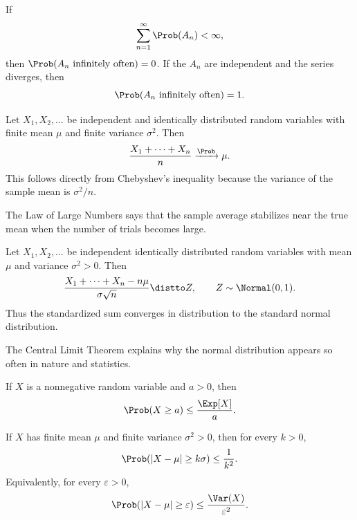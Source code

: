     \begin{theorem}
        If
        \[
            \sum_{n=1}^{\infty}\Prob(A_n)<\infty,
        \]
        then $\Prob(A_n\text{ infinitely often})=0$. If the $A_n$ are
        independent and the series diverges, then
        \[
            \Prob(A_n\text{ infinitely often})=1.
        \]
    \end{theorem}

    \begin{theorem}
        Let $X_1,X_2,\dots$ be independent and identically distributed random
        variables with finite mean $\mu$ and finite variance $\sigma^2$. Then
        \[
            \frac{X_1+\cdots+X_n}{n}
            \xrightarrow{\Prob}
            \mu.
        \]
        This follows directly from Chebyshev's inequality because the variance
        of the sample mean is $\sigma^2/n$.
    \end{theorem}

    \begin{idea}
        The Law of Large Numbers says that the sample average stabilizes near
        the true mean when the number of trials becomes large.
    \end{idea}

    \begin{theorem}
        Let $X_1,X_2,\dots$ be independent identically distributed random
        variables with mean $\mu$ and variance $\sigma^2>0$. Then
        \[
            \frac{X_1+\cdots+X_n-n\mu}{\sigma\sqrt n}
            \distto
            Z,
            \qquad
            Z\sim\Normal(0,1).
        \]
        Thus the standardized sum converges in distribution to the standard
        normal distribution.
    \end{theorem}

    \begin{remark}
        The Central Limit Theorem explains why the normal distribution appears
        so often in nature and statistics.
    \end{remark}

    \begin{theorem}
        If $X$ is a nonnegative random variable and $a>0$, then
        \[
            \Prob(X\geq a)
            \leq
            \frac{\Exp[X]}{a}.
        \]
    \end{theorem}

    \begin{theorem}
        If $X$ has finite mean $\mu$ and finite variance $\sigma^2>0$, then
        for every $k>0$,
        \[
            \Prob(|X-\mu|\geq k\sigma)
            \leq
            \frac{1}{k^2}.
        \]
        Equivalently, for every $\varepsilon>0$,
        \[
            \Prob(|X-\mu|\geq \varepsilon)
            \leq
            \frac{\Var(X)}{\varepsilon^2}.
        \]
    \end{theorem}

